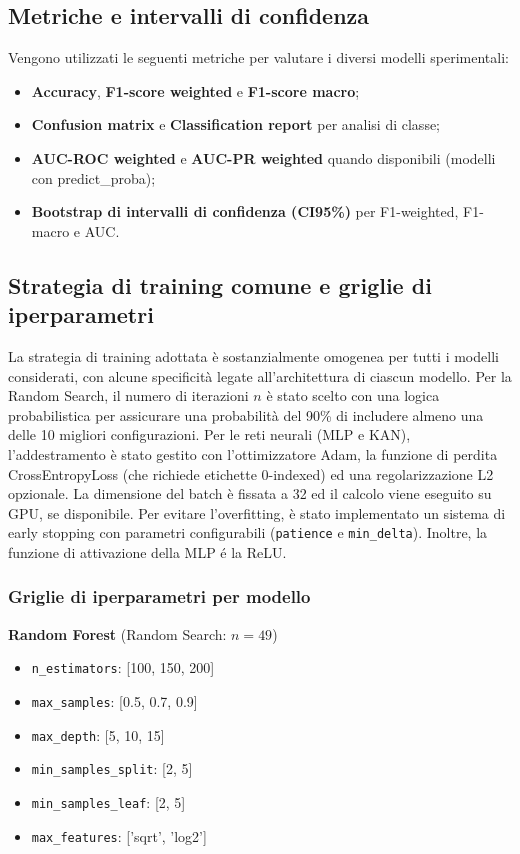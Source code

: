 \documentclass[a4paper,12pt]{report}
\begin{document}
	\subsection{Metriche e intervalli di confidenza}
	Vengono utilizzati le seguenti metriche per valutare i diversi modelli sperimentali:
	\begin{itemize}
		\item \textbf{Accuracy}, \textbf{F1-score weighted} e \textbf{F1-score macro};
		\item \textbf{Confusion matrix} e \textbf{Classification report} per analisi di classe;
		\item \textbf{AUC-ROC weighted} e \textbf{AUC-PR weighted} quando disponibili (modelli con predict\_proba);
		\item \textbf{Bootstrap di intervalli di confidenza (CI95\%)} per F1-weighted, F1-macro e AUC.
	\end{itemize}
	
	\subsection{Strategia di training comune e griglie di iperparametri}
	La strategia di training adottata è sostanzialmente omogenea per tutti i modelli considerati, con alcune specificità legate all'architettura di ciascun modello. Per la Random Search, il numero di iterazioni $n$ è stato scelto con una logica probabilistica per assicurare una probabilità del 90\% di includere almeno una delle 10 migliori configurazioni. Per le reti neurali (MLP e KAN), l'addestramento è stato gestito con l'ottimizzatore Adam, la funzione di perdita CrossEntropyLoss (che richiede etichette 0-indexed) ed una regolarizzazione L2 opzionale. La dimensione del batch è fissata a 32 ed il calcolo viene eseguito su GPU, se disponibile. Per evitare l'overfitting, è stato implementato un sistema di early stopping con parametri configurabili (\texttt{patience} e \texttt{min\_delta}). Inoltre, la funzione di attivazione della MLP é la ReLU.
	
	\subsubsection{Griglie di iperparametri per modello}
	
	\smallskip
	\noindent\textbf{Random Forest} \quad (Random Search: $n=49$)
	\begin{itemize}
		\item \texttt{n\_estimators}: [100, 150, 200]
		\item \texttt{max\_samples}: [0.5, 0.7, 0.9]
		\item \texttt{max\_depth}: [5, 10, 15]
		\item \texttt{min\_samples\_split}: [2, 5]
		\item \texttt{min\_samples\_leaf}: [2, 5]
		\item \texttt{max\_features}: ['sqrt', 'log2']
	\end{itemize}
	
\end{document}

